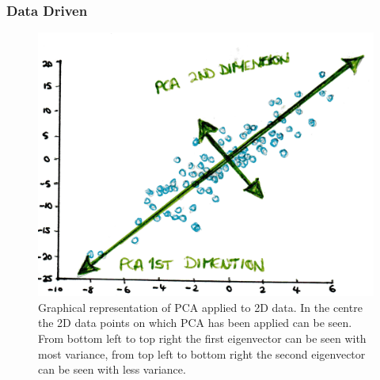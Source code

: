             \subsubsection{Data Driven} \label{sec:data_driven}
                \begin{figure}
                    \centering
                        
                    \includegraphics[width=1.0\linewidth]{figures/background_pca.png}
                        
                    \captionsetup{singlelinecheck=false, justification=raggedright}
                    \caption{Graphical representation of \gls{PCA} applied to \gls{2D} data. In the centre the \gls{2D} data points on which \gls{PCA} has been applied can be seen. From bottom left to top right the first eigenvector can be seen with most variance, from top left to bottom right the second eigenvector can be seen with less variance.} \label{fig:data_driven_pca}
                \end{figure}
                
